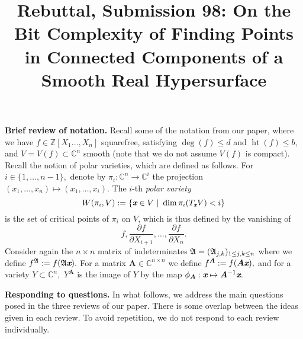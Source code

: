 \documentclass{article}
\def\mA{{\bm A}}
\def\xb{\textit{\textbf{x}}}
\DeclareMathOperator{\htt}{ht}
\def\C{\mathbb{C}}
\def\pa{\partial}
\newcommand{\ZZ}{{\mathbb{Z}}}
\def\A{\frak{A}}
\begin{document}
\title{Rebuttal, Submission 98: On the Bit Complexity of Finding Points in Connected Components of a Smooth Real Hypersurface}
\author{}
\date{}


\maketitle
\noindent \textbf{Brief  review of notation.} 
Recall some of the notation from our paper, where we have $f\in\ZZ[X_1\hdots,X_n]$ squarefree, satisfying $\deg(f) \leq d$ and $\htt(f) \leq b$,
and $V=V(f) \subset \C^n$ smooth (note that we do not assume $V(f)$ is compact). Recall the notion of polar varieties, which are defined as follows. For $i \in
\{1,\hdots,n-1\},$ denote by $\pi_i:\C^n \rightarrow \C^i$ the
projection $(x_1,\hdots,x_n) \mapsto (x_1,\hdots,x_i)$.  The $i$-th
\textit{polar variety} \[W(\pi_i,V) := \{\xb \in V~|~\dim \pi_i(T_\xb
V) < i\}\] is the set of critical points of $\pi_i$ on $V$, which is
thus defined by the vanishing of 
\[
f,\frac{\pa f}{\pa
  X_{i+1}},\hdots,\frac{\pa f}{\pa X_n}.
\]
Consider again the $n\times n$ matrix of indeterminates $\A=(\A_{j,k})_{1 \le j,k \le n}$ where we define $f^\A := f(\A\xb).$ For a matrix $\mA \in \C^{n \times n}$ we define $f^\mA := f(\mA\xb),$ and for a variety $Y \subset \C^n,$  $Y^{\mA}$ is the image of $Y$ by the map $\phi_{\mA} : \xb \mapsto \mA^{-1}\xb.$
\vspace{2mm}
\par 
\noindent \textbf{Responding to questions.} 
In what follows, we address the main questions posed in the three reviews of our paper. There is some overlap between the ideas given in each review. To avoid repetition, we do not respond to each review individually. 
\end{document}
